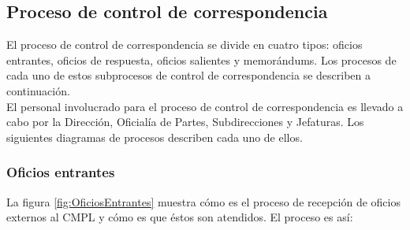 	\subsection{Proceso de control de correspondencia}
	El proceso de control de correspondencia se divide en cuatro tipos: oficios entrantes, oficios de respuesta, oficios salientes y memorándums. Los procesos de cada uno de estos subprocesos de control de correspondencia se describen a continuación.\\
	
	El personal involucrado para el proceso de control de correspondencia es llevado a cabo por la  Dirección, Oficialía de Partes, Subdirecciones y Jefaturas. Los siguientes diagramas de procesos describen cada uno de ellos.\\
	
	\subsubsection{Oficios entrantes}
	La figura \ref{fig:OficiosEntrantes} muestra cómo es el proceso de recepción de oficios externos al CMPL y cómo es que éstos son atendidos. El proceso es así:
	
